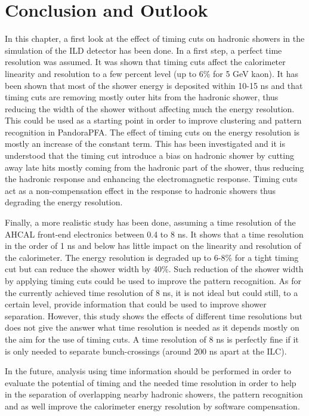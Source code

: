 \section{Conclusion and Outlook}

In this chapter, a first look at the effect of timing cuts on hadronic showers in the \geant simulation of the ILD detector has been done. In a first step, a perfect time resolution was assumed. It was shown that timing cuts affect the calorimeter linearity and resolution to a few percent level (up to 6\% for 5 GeV kaon). It has been shown that most of the shower energy is deposited within 10-15 ns and that timing cuts are removing mostly outer hits from the hadronic shower, thus reducing the width of the shower without affecting much the energy resolution. This could be used as a starting point in order to improve clustering and pattern recognition in PandoraPFA. The effect of timing cuts on the energy resolution is mostly an increase of the constant term. This has been investigated and it is understood that the timing cut introduce a bias on hadronic shower by cutting away late hits mostly coming from the hadronic part of the shower, thus reducing the hadronic response and enhancing the electromagnetic response. Timing cuts act as a non-compensation effect in the response to hadronic showers thus degrading the energy resolution.

Finally, a more realistic study has been done, assuming a time resolution of the AHCAL front-end electronics between 0.4 to 8 ns. It shows that a time resolution in the order of 1 ns and below has little impact on the linearity and resolution of the calorimeter. The energy resolution is degraded up to 6-8\% for a tight timing cut but can reduce the shower width by 40\%. Such reduction of the shower width by applying timing cuts could be used to improve the pattern recognition. As for the currently achieved time resolution of 8 ns, it is not ideal but could still, to a certain level, provide information that could be used to improve shower separation. However, this study shows the effects of different time resolutions but does not give the answer what time resolution is needed as it depends mostly on the aim for the use of timing cuts. A time resolution of 8 ns is perfectly fine if it is only needed to separate bunch-crossings (around 200 ns apart at the ILC). 

In the future, analysis using time information should be performed in order to evaluate the potential of timing and the needed time resolution in order to help in the separation of overlapping nearby hadronic showers, the pattern recognition and as well improve the calorimeter energy resolution by software compensation.
